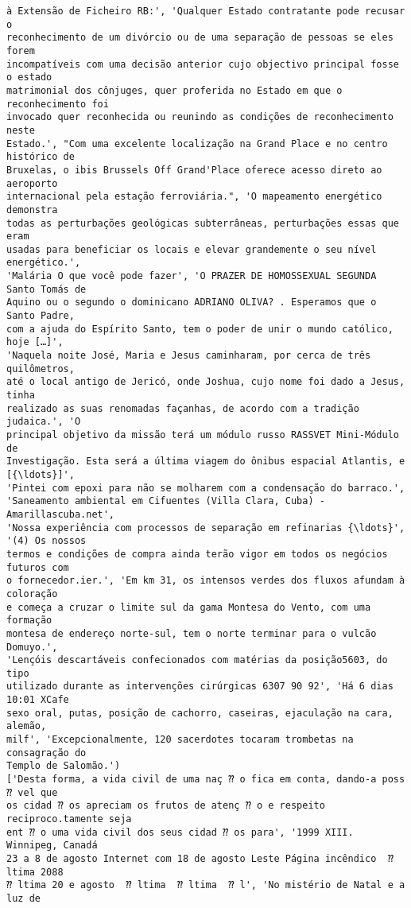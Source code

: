\documentclass[10pt]{article}
\begin{document}
\begin{Verbatim}[commandchars=\\\{\}]
à Extensão de Ficheiro RB:', 'Qualquer Estado contratante pode recusar o
reconhecimento de um divórcio ou de uma separação de pessoas se eles forem
incompatíveis com uma decisão anterior cujo objectivo principal fosse o estado
matrimonial dos cônjuges, quer proferida no Estado em que o reconhecimento foi
invocado quer reconhecida ou reunindo as condições de reconhecimento neste
Estado.', "Com uma excelente localização na Grand Place e no centro histórico de
Bruxelas, o ibis Brussels Off Grand'Place oferece acesso direto ao aeroporto
internacional pela estação ferroviária.", 'O mapeamento energético demonstra
todas as perturbações geológicas subterrâneas, perturbações essas que eram
usadas para beneficiar os locais e elevar grandemente o seu nível energético.',
'Malária O que você pode fazer', 'O PRAZER DE HOMOSSEXUAL SEGUNDA Santo Tomás de
Aquino ou o segundo o dominicano ADRIANO OLIVA? . Esperamos que o Santo Padre,
com a ajuda do Espírito Santo, tem o poder de unir o mundo católico, hoje […]',
'Naquela noite José, Maria e Jesus caminharam, por cerca de três quilômetros,
até o local antigo de Jericó, onde Joshua, cujo nome foi dado a Jesus, tinha
realizado as suas renomadas façanhas, de acordo com a tradição judaica.', 'O
principal objetivo da missão terá um módulo russo RASSVET Mini-Módulo de
Investigação. Esta será a última viagem do ônibus espacial Atlantis, e [{\ldots}]',
'Pintei com epoxi para não se molharem com a condensação do barraco.',
'Saneamento ambiental em Cifuentes (Villa Clara, Cuba) - Amarillascuba.net',
'Nossa experiência com processos de separação em refinarias {\ldots}', '(4) Os nossos
termos e condições de compra ainda terão vigor em todos os negócios futuros com
o fornecedor.ier.', 'Em km 31, os intensos verdes dos fluxos afundam à coloração
e começa a cruzar o limite sul da gama Montesa do Vento, com uma formação
montesa de endereço norte-sul, tem o norte terminar para o vulcão Domuyo.',
'Lençóis descartáveis confecionados com matérias da posição5603, do tipo
utilizado durante as intervenções cirúrgicas 6307 90 92', 'Há 6 dias 10:01 XCafe
sexo oral, putas, posição de cachorro, caseiras, ejaculação na cara, alemão,
milf', 'Excepcionalmente, 120 sacerdotes tocaram trombetas na consagração do
Templo de Salomão.')
['Desta forma, a vida civil de uma naç ⁇ o fica em conta, dando-a poss ⁇ vel que
os cidad ⁇ os apreciam os frutos de atenç ⁇ o e respeito reciproco.tamente seja
ent ⁇ o uma vida civil dos seus cidad ⁇ os para', '1999 XIII. Winnipeg, Canadá
23 a 8 de agosto Internet com 18 de agosto Leste Página incêndico  ⁇ ltima 2088
⁇ ltima 20 e agosto  ⁇ ltima  ⁇ ltima  ⁇ l', 'No mistério de Natal e a luz de

\end{Verbatim}
\end{document}
